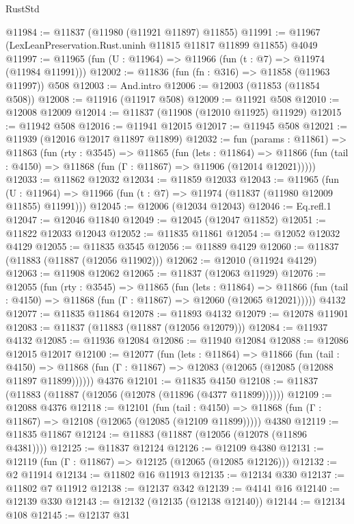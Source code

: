 \begin{lexlean}{RustStd}
\begin{coremodule}
@11984 := @11837 (@11980 (@11921 @11897) @11855)
@11991 := @11967 (LexLeanPreservation.Rust.uninh @11815 @11817 @11899 @11855) @4049
@11997 := @11965 (fun (U : @11964) => @11966 (fun (t : @7) => @11974 (@11984 @11991)))
@12002 := @11836 (fun (fn : @316) => @11858 (@11963 @11997)) @508
@12003 := And.intro
@12006 := @12003 (@11853 (@11854 @508))
@12008 := @11916 (@11917 @508)
@12009 := @11921 @508
@12010 := @12008 @12009
@12014 := @11837 (@11908 (@12010 @11925) @11929)
@12015 := @11942 @508
@12016 := @11941 @12015
@12017 := @11945 @508
@12021 := @11939 (@12016 @12017 @11897 @11899)
@12032 := fun (params : @11861) =>
  @11863
    (fun (rty : @3545) =>
    @11865
      (fun (lets : @11864) =>
      @11866 (fun (tail : @4150) => @11868 (fun (Γ : @11867) => @11906 (@12014 @12021)))))
@12033 := @11862 @12032
@12034 := @11859 @12033
@12043 := @11965
    (fun (U : @11964) => @11966 (fun (t : @7) => @11974 (@11837 (@11980 @12009 @11855) @11991)))
@12045 := @12006 (@12034 @12043)
@12046 := Eq.refl.{1}
@12047 := @12046 @11840
@12049 := @12045 (@12047 @11852)
@12051 := @11822 @12033 @12043
@12052 := @11835 @11861
@12054 := @12052 @12032 @4129
@12055 := @11835 @3545
@12056 := @11889 @4129
@12060 := @11837 (@11883 (@11887 (@12056 @11902)))
@12062 := @12010 (@11924 @4129)
@12063 := @11908 @12062
@12065 := @11837 (@12063 @11929)
@12076 := @12055
    (fun (rty : @3545) =>
    @11865
      (fun (lets : @11864) =>
      @11866 (fun (tail : @4150) => @11868 (fun (Γ : @11867) => @12060 (@12065 @12021)))))
    @4132
@12077 := @11835 @11864
@12078 := @11893 @4132
@12079 := @12078 @11901
@12083 := @11837 (@11883 (@11887 (@12056 @12079)))
@12084 := @11937 @4132
@12085 := @11936 @12084
@12086 := @11940 @12084
@12088 := @12086 @12015 @12017
@12100 := @12077
    (fun (lets : @11864) =>
    @11866
      (fun (tail : @4150) =>
      @11868 (fun (Γ : @11867) => @12083 (@12065 (@12085 (@12088 @11897 @11899))))))
    @4376
@12101 := @11835 @4150
@12108 := @11837 (@11883 (@11887 (@12056 (@12078 (@11896 (@4377 @11899))))))
@12109 := @12088 @4376
@12118 := @12101
    (fun (tail : @4150) => @11868 (fun (Γ : @11867) => @12108 (@12065 (@12085 (@12109 @11899)))))
    @4380
@12119 := @11835 @11867
@12124 := @11883 (@11887 (@12056 (@12078 (@11896 @4381))))
@12125 := @11837 @12124
@12126 := @12109 @4380
@12131 := @12119 (fun (Γ : @11867) => @12125 (@12065 (@12085 @12126)))
@12132 := @2 @11914
@12134 := @11802 @16 @11913
@12135 := @12134 @330
@12137 := @11802 @7 @11912
@12138 := @12137 @342
@12139 := @4141 @16
@12140 := @12139 @330
@12143 := @12132 (@12135 (@12138 @12140))
@12144 := @12134 @108
@12145 := @12137 @31

\end{coremodule}
\end{lexlean}
